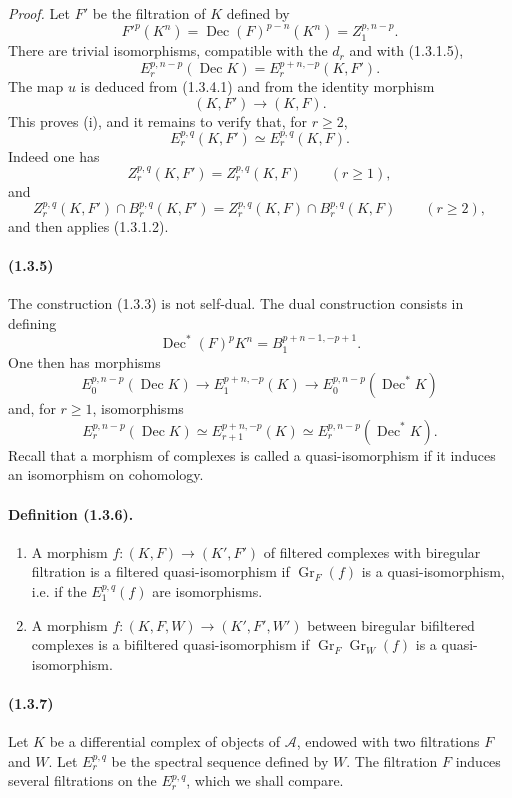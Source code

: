 \documentclass[10pt]{article}
\newcommand{\Gr}{\operatorname{Gr}}
\newcommand{\calA}{\mathcal A}
\newcommand{\Dec}{\operatorname{Dec}}
\begin{document}
\emph{Proof.} Let $F'$ be the filtration of $K$ defined by
\[
F'^p(K^n)=\Dec(F)^{p-n}(K^n)=Z_1^{p,n-p}.
\]
There are trivial isomorphisms, compatible with the $d_r$ and with (1.3.1.5),
\[
\tag{1.3.4.1}
E_r^{p,n-p}(\Dec K)=E_r^{p+n,-p}(K,F').
\]
The map $u$ is deduced from (1.3.4.1) and from the identity morphism
\[
(K,F')\longrightarrow(K,F).
\]
This proves (i), and it remains to verify that, for $r\ge2$,
\[
E_r^{p,q}(K,F')\simeq E_r^{p,q}(K,F).
\]
Indeed one has
\[
Z_r^{p,q}(K,F')=Z_r^{p,q}(K,F)\qquad(r\ge1),
\]
and
\[
Z_r^{p,q}(K,F')\cap B_r^{p,q}(K,F')=Z_r^{p,q}(K,F)\cap B_r^{p,q}(K,F)\qquad(r\ge2),
\]
and then applies (1.3.1.2).

\paragraph{(1.3.5)} The construction (1.3.3) is not self-dual. The dual construction consists in defining
\[
\Dec^*(F)^pK^n=B_1^{p+n-1,-p+1}.
\]
One then has morphisms
\[
E_0^{p,n-p}(\Dec K)\longrightarrow E_1^{p+n,-p}(K)\longrightarrow E_0^{p,n-p}(\Dec^*K)
\]
and, for $r\ge1$, isomorphisms
\[
E_r^{p,n-p}(\Dec K)\simeq E_{r+1}^{p+n,-p}(K)\simeq E_r^{p,n-p}(\Dec^*K).
\]
Recall that a morphism of complexes is called a quasi-isomorphism if it induces an isomorphism on cohomology.

\paragraph{Definition (1.3.6).}
\begin{enumerate}[label=(\roman*)]
\item A morphism $f:(K,F)\to(K',F')$ of filtered complexes with biregular filtration is a filtered quasi-isomorphism if $\Gr_F(f)$ is a quasi-isomorphism, i.e. if the $E_1^{p,q}(f)$ are isomorphisms.
\item A morphism $f:(K,F,W)\to(K',F',W')$ between biregular bifiltered complexes is a bifiltered quasi-isomorphism if $\Gr_F\Gr_W(f)$ is a quasi-isomorphism.
\end{enumerate}

\paragraph{(1.3.7)} Let $K$ be a differential complex of objects of $\calA$, endowed with two filtrations $F$ and $W$. Let $E_r^{p,q}$ be the spectral sequence defined by $W$. The filtration $F$ induces several filtrations on the $E_r^{p,q}$, which we shall compare.
\end{document}
